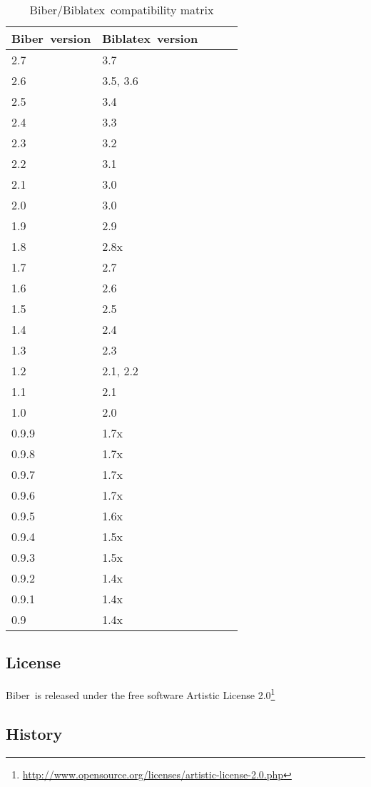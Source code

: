 \documentclass{ltxdockit}
\newcommand*{\biber}{Biber\xspace}
\newcommand*{\biblatex}{Biblatex\xspace}
\begin{document}
\begin{table}
\begin{center}
\small
\begin{tabular}{lllll}
\toprule
\biber\ version & \biblatex\ version\\
\midrule
2.7 & 3.7\\
2.6 & 3.5, 3.6\\
2.5 & 3.4\\
2.4 & 3.3\\
2.3 & 3.2\\
2.2 & 3.1\\
2.1 & 3.0\\
2.0 & 3.0\\
1.9 & 2.9\\
1.8 & 2.8x\\
1.7 & 2.7\\
1.6 & 2.6\\
1.5 & 2.5\\
1.4 & 2.4\\
1.3 & 2.3\\
1.2 & 2.1, 2.2\\
1.1 & 2.1\\
1.0 & 2.0\\
0.9.9 & 1.7x\\
0.9.8 & 1.7x\\
0.9.7 & 1.7x\\
0.9.6 & 1.7x\\
0.9.5 & 1.6x\\
0.9.4 & 1.5x\\
0.9.3 & 1.5x\\
0.9.2 & 1.4x\\
0.9.1 & 1.4x\\
0.9 & 1.4x\\
\bottomrule
\end{tabular}
\end{center}
\caption{\biber/\biblatex\ compatibility matrix}
\label{tab:compat}
\end{table}

\subsection{License}

\biber\ is released under the free software Artistic License 2.0\footnote{\url{http://www.opensource.org/licenses/artistic-license-2.0.php}}

\subsection{History}
\end{document}
